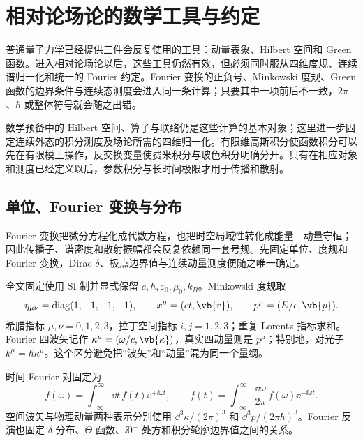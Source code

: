 \chapter{相对论场论的数学工具与约定}\label{chap:math-foundations}

普通量子力学已经提供三件会反复使用的工具：动量表象、Hilbert 空间和 Green 函数。进入相对论场论以后，这些工具仍然有效，但必须同时服从四维度规、连续谱归一化和统一的 Fourier 约定。Fourier 变换的正负号、Minkowski 度规、Green 函数的边界条件与连续态测度会进入同一条计算；只要其中一项前后不一致，$2\pi$、$\hbar$ 或整体符号就会随之出错。

数学预备中的 Hilbert 空间、算子与联络仍是这些计算的基本对象；这里进一步固定连续外态的积分测度及场论所需的四维归一化。有限维高斯积分使函数积分可以先在有限模上操作，反交换变量使费米积分与玻色积分明确分开。只有在相应对象和测度已经定义以后，参数积分与长时间极限才用于传播和散射。

\section{单位、Fourier 变换与分布}

Fourier 变换把微分方程化成代数方程，也把时空局域性转化成能量—动量守恒；因此传播子、谱密度和散射振幅都会反复依赖同一套号规。先固定单位、度规和 Fourier 变换，Dirac $\delta$、极点边界值与连续动量测度便随之唯一确定。

全文固定使用 SI 制并显式保留 $c,\hbar,\varepsilon_0,\mu_0,k_B$。Minkowski 度规取
\begin{equation}
\eta_{\mu\nu}=\operatorname{diag}(1,-1,-1,-1),
\qquad x^\mu=(ct,\vb{r}),
\qquad p^\mu=(E/c,\vb{p}).
\label{eq:global-metric-convention}
\end{equation}
希腊指标 $\mu,\nu=0,1,2,3$，拉丁空间指标 $i,j=1,2,3$；重复 Lorentz 指标求和。Fourier 四波矢记作 $\kappa^\mu=(\omega/c,\vb{\kappa})$，真实四动量则是 $p^\mu$；特别地，对光子 $k^\mu=\hbar\kappa^\mu$。这个区分避免把“波矢”和“动量”混为同一个量纲。

时间 Fourier 对固定为
\begin{equation}
\widetilde f(\omega)=\int_{-\infty}^{\infty}\dd t\,f(t)\ee^{+\ii\omega t},
\qquad
f(t)=\int_{-\infty}^{\infty}\frac{\dd\omega}{2\pi}\,\widetilde f(\omega)\ee^{-\ii\omega t}.
\label{eq:global-time-fourier}
\end{equation}
空间波矢与物理动量两种表示分别使用 $\dd^3 \kappa/(2\pi)^3$ 和 $\dd^3 p/(2\pi\hbar)^3$。Fourier 反演也固定 $\delta$ 分布、$\Theta$ 函数、$\ii0^+$ 处方和积分轮廓边界值之间的关系。

